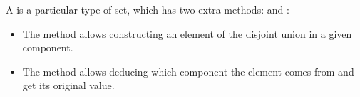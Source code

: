 
A \SetDisjointUnion is a particular type of set, which has two extra methods:  and :
\begin{itemize}
    \item The method  allows constructing an element of the disjoint union in a given component.
    \item The method  allows deducing which component the element comes from and get its original value.
\end{itemize}

\begin{widepar}
\end{widepar}


\begin{widepar}
\end{widepar}
